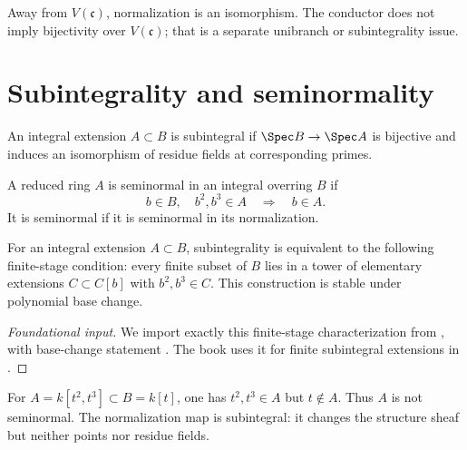 Away from \(V(\mathfrak c)\), normalization is an isomorphism.  The
conductor does not imply bijectivity over \(V(\mathfrak c)\); that is a
separate unibranch or subintegrality issue.

\section{Subintegrality and seminormality}
\label{sec:appA-subintegrality}

\begin{definition}
\label{def:appA-subintegral}
An integral extension \(A\subset B\) is subintegral if
\(\Spec B\to\Spec A\) is bijective and induces an isomorphism of residue
fields at corresponding primes.
\end{definition}

\begin{definition}[Seminormality]
\label{def:appA-seminormal}
A reduced ring \(A\) is seminormal in an integral overring \(B\) if
\[
 b\in B,\quad b^2,b^3\in A
 \quad\Longrightarrow\quad b\in A.
\tag{A.7}\label{eq:appA-square-cube}
\]
It is seminormal if it is seminormal in its normalization.
\end{definition}

\begin{theorem}\label{thm:appA-square-cube}
For an integral extension \(A\subset B\), subintegrality is equivalent to
the following finite-stage condition: every finite subset of \(B\) lies in
a tower of elementary extensions \(C\subset C[b]\) with
\(b^2,b^3\in C\).  This construction is stable under polynomial base
change.
\end{theorem}

\begin{proof}[Foundational input]
We import exactly this finite-stage characterization from
\cite[\href{https://stacks.math.columbia.edu/tag/0CND}{Tag 0CND}]
{stacks-project}, with base-change statement
\cite[\href{https://stacks.math.columbia.edu/tag/0EUH}{Tag 0EUH}]
{stacks-project}.  The book uses it for finite subintegral extensions in
.
\end{proof}

\begin{example}
\label{ex:appA-cusp-seminormalization}
For \(A=k[t^2,t^3]\subset B=k[t]\), one has \(t^2,t^3\in A\) but
\(t\notin A\).  Thus \(A\) is not seminormal.  The normalization map is
subintegral: it changes the structure sheaf but neither points nor residue
fields.
\end{example}


